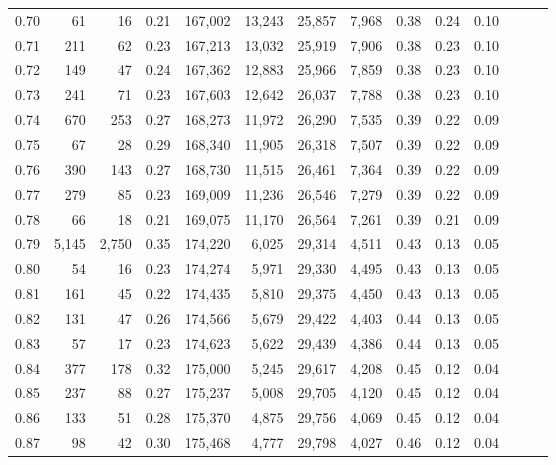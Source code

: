 \begin{tabular}{rrrrrrrrrrrrrr}
0.70 &      61 &     16 &  0.21 &  167,002 &   13,243 &  25,857 &   7,968 &  0.38 &  0.24 &      0.10 \\
0.71 &     211 &     62 &  0.23 &  167,213 &   13,032 &  25,919 &   7,906 &  0.38 &  0.23 &      0.10 \\
0.72 &     149 &     47 &  0.24 &  167,362 &   12,883 &  25,966 &   7,859 &  0.38 &  0.23 &      0.10 \\
0.73 &     241 &     71 &  0.23 &  167,603 &   12,642 &  26,037 &   7,788 &  0.38 &  0.23 &      0.10 \\
0.74 &     670 &    253 &  0.27 &  168,273 &   11,972 &  26,290 &   7,535 &  0.39 &  0.22 &      0.09 \\
0.75 &      67 &     28 &  0.29 &  168,340 &   11,905 &  26,318 &   7,507 &  0.39 &  0.22 &      0.09 \\
0.76 &     390 &    143 &  0.27 &  168,730 &   11,515 &  26,461 &   7,364 &  0.39 &  0.22 &      0.09 \\
0.77 &     279 &     85 &  0.23 &  169,009 &   11,236 &  26,546 &   7,279 &  0.39 &  0.22 &      0.09 \\
0.78 &      66 &     18 &  0.21 &  169,075 &   11,170 &  26,564 &   7,261 &  0.39 &  0.21 &      0.09 \\
0.79 &   5,145 &  2,750 &  0.35 &  174,220 &    6,025 &  29,314 &   4,511 &  0.43 &  0.13 &      0.05 \\
0.80 &      54 &     16 &  0.23 &  174,274 &    5,971 &  29,330 &   4,495 &  0.43 &  0.13 &      0.05 \\
0.81 &     161 &     45 &  0.22 &  174,435 &    5,810 &  29,375 &   4,450 &  0.43 &  0.13 &      0.05 \\
0.82 &     131 &     47 &  0.26 &  174,566 &    5,679 &  29,422 &   4,403 &  0.44 &  0.13 &      0.05 \\
0.83 &      57 &     17 &  0.23 &  174,623 &    5,622 &  29,439 &   4,386 &  0.44 &  0.13 &      0.05 \\
0.84 &     377 &    178 &  0.32 &  175,000 &    5,245 &  29,617 &   4,208 &  0.45 &  0.12 &      0.04 \\
0.85 &     237 &     88 &  0.27 &  175,237 &    5,008 &  29,705 &   4,120 &  0.45 &  0.12 &      0.04 \\
0.86 &     133 &     51 &  0.28 &  175,370 &    4,875 &  29,756 &   4,069 &  0.45 &  0.12 &      0.04 \\
0.87 &      98 &     42 &  0.30 &  175,468 &    4,777 &  29,798 &   4,027 &  0.46 &  0.12 &      0.04 \\

\end{tabular}
